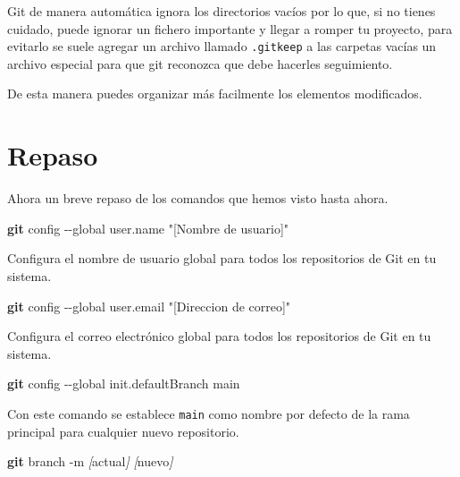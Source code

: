 \documentclass[
]{book}
\newenvironment{Shaded}{\begin{snugshade}}{\end{snugshade}}
\newcommand{\AttributeTok}[1]{\textcolor[rgb]{0.13,0.29,0.53}{#1}}
\newcommand{\FunctionTok}[1]{\textcolor[rgb]{0.13,0.29,0.53}{\textbf{#1}}}
\newcommand{\NormalTok}[1]{#1}
\newcommand{\PreprocessorTok}[1]{\textcolor[rgb]{0.56,0.35,0.01}{\textit{#1}}}
\newcommand{\SpecialStringTok}[1]{\textcolor[rgb]{0.31,0.60,0.02}{#1}}
\newcommand{\StringTok}[1]{\textcolor[rgb]{0.31,0.60,0.02}{#1}}
\begin{document}
Git de manera automática ignora los directorios vacíos por lo que, si no tienes cuidado, puede ignorar un fichero importante y llegar a romper tu proyecto, para evitarlo se suele agregar un archivo llamado \texttt{.gitkeep} a las carpetas vacías un archivo especial para que git reconozca que debe hacerles seguimiento.

De esta manera puedes organizar más facilmente los elementos modificados.

\section{Repaso}\label{repaso}

Ahora un breve repaso de los comandos que hemos visto hasta ahora.

\begin{Shaded}
\begin{Highlighting}[]
\FunctionTok{git}\NormalTok{ config }\AttributeTok{{-}{-}global}\NormalTok{ user.name }\StringTok{"[Nombre de usuario]"}
\end{Highlighting}
\end{Shaded}

Configura el nombre de usuario global para todos los repositorios de Git en tu sistema.

\begin{Shaded}
\begin{Highlighting}[]
\FunctionTok{git}\NormalTok{ config }\AttributeTok{{-}{-}global}\NormalTok{ user.email }\StringTok{"[Direccion de correo]"}
\end{Highlighting}
\end{Shaded}

Configura el correo electrónico global para todos los repositorios de Git en tu sistema.

\begin{Shaded}
\begin{Highlighting}[]
\FunctionTok{git}\NormalTok{ config }\AttributeTok{{-}{-}global}\NormalTok{ init.defaultBranch main}
\end{Highlighting}
\end{Shaded}

Con este comando se establece \texttt{main} como nombre por defecto de la rama principal para cualquier nuevo repositorio.

\begin{Shaded}
\begin{Highlighting}[]
\FunctionTok{git}\NormalTok{ branch }\AttributeTok{{-}m} \PreprocessorTok{[}\SpecialStringTok{actual}\PreprocessorTok{]} \PreprocessorTok{[}\SpecialStringTok{nuevo}\PreprocessorTok{]}
\end{Highlighting}
\end{Shaded}
\end{document}
